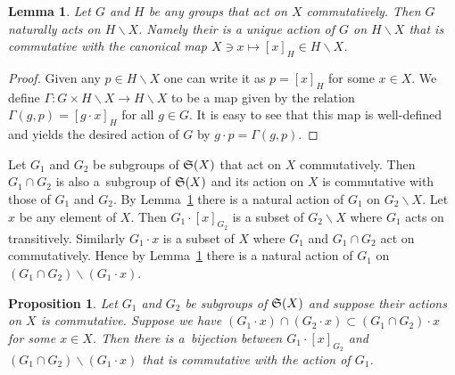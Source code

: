 \documentclass[11pt]{article}
\newtheorem{lemma}{Lemma}
\newtheorem{proposition}{Proposition}
\begin{document}
\begin{lemma}\label{lem:jan29_1}
Let $G$ and $H$ be any groups that act on $X$ commutatively.
Then $G$ naturally acts on $H \backslash X$.
Namely their is a unique action of $G$ on $H \backslash X$ that is commutative with
the canonical map $X \ni x \mapsto [x]_H \in H \backslash X$.
\end{lemma}

\begin{proof}
Given any $p \in H \backslash X$ one can write it as $p = [x]_H$ for some $x \in X$.
We def\/ine $\varGamma : G \times H \backslash X \rightarrow H \backslash X$ to be a map given
by the relation $\varGamma (g,  p) = [g \cdot x]_H$ for all $g \in G$.
It is easy to see that this map is well-def\/ined and yields the desired action of $G$ by $g \cdot p = \varGamma (g,  p)$.
\end{proof}
Let $G_1$ and $G_2$ be subgroups of ${\frak S}(X)$ that act on $X$ commutatively.
Then $G_1 \cap G_2$ is also a~subgroup of ${\frak S}(X)$
and its action on $X$ is commutative with those of $G_1$ and $G_2$.
By Lemma~\ref{lem:jan29_1} there is a natural action of $G_1$ on $G_2 \backslash X$.
Let $x$ be any element of $X$.
{Then $G_1 \cdot [x]_{G_2}$ is a subset of $G_2 \backslash X$ where
$G_1$ acts on transitively.
Similarly $G_1 \cdot x$ is a subset of $X$ where $G_1$ and $G_1 \cap G_2$ act on commutatively.}
Hence by Lemma~\ref{lem:jan29_1}  there is a natural action of $G_1$ on
$(G_1 \cap G_2) \backslash (G_1 \cdot x)$.
\begin{proposition}\label{prop:jan29_3}
Let $G_1$ and $G_2$ be subgroups of ${\frak S}(X)$ and suppose their actions on $X$ is commutative.
Suppose we have $(G_1 \cdot x) \cap (G_2 \cdot x) \subset (G_1 \cap G_2) \cdot x$ for some $x \in X$.
Then there is a~bijection between $G_1 \cdot [x]_{G_2}$ and $(G_1 \cap G_2) \backslash (G_1 \cdot x)$
that is commutative with the action of $G_1$.
\end{proposition}
\end{document}
